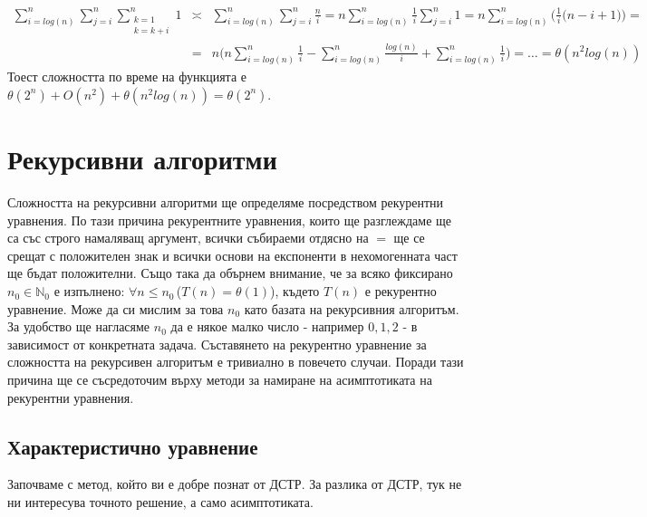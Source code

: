 \begin{solution}
	\begin{eqnarray*}
		\sum\limits_{i=log(n)}^n\sum\limits_{j=i}^n\sum\limits_{\substack{k=1\\k=k+i}}^n1 &\asymp&
		\sum\limits_{i=log(n)}^n\sum\limits_{j=i}^n\frac ni =
		n\sum\limits_{i=log(n)}^n\frac1i\sum\limits_{j=i}^n1 =
		n\sum\limits_{i=log(n)}^n\bigg(\frac1i\Big(n-i+1\Big)\bigg) = \\
		&=&
		n\Bigg(n\sum\limits_{i=log(n)}^n\frac1i-\sum\limits_{i=log(n)}^n\frac{log(n)}i+\sum\limits_{i=log(n)}^n\frac1i\Bigg) = 
		\dots =
		\theta(n^2log(n))		
	\end{eqnarray*}
	Тоест сложността по време на функцията е $\theta(2^n)+O(n^2)+\theta(n^2log(n))=\theta(2^n)$.
\end{solution}\newpage


\section{Рекурсивни алгоритми}\label{sec-rec-alg}

Сложността на рекурсивни алгоритми ще определяме посредством рекурентни уравнения. По тази причина рекурентните уравнения, които ще разглеждаме ще са със строго намаляващ аргумент, всички събираеми отдясно на $=$ ще се срещат с положителен знак и всички основи на експоненти в нехомогенната част ще бъдат положителни. Също така да обърнем внимание, че за всяко фиксирано $n_0\in\mathbb{N}_0$ е изпълнено: $\forall n\le n_0\,$($T(n)=\theta(1)$), където $T(n)$ е рекурентно уравнение. Може да си мислим за това $n_0$ като базата на рекурсивния алгоритъм. За удобство ще нагласяме $n_0$ да е някое малко число - например $0,1,2$ - в зависимост от конкретната задача. Съставянето на рекурентно уравнение за сложността на рекурсивен алгоритъм е тривиално в повечето случаи. Поради тази причина ще се съсредоточим върху методи за намиране на асимптотиката на рекурентни уравнения.\\

\subsection{Характеристично уравнение}

Започваме с метод, който ви е добре познат от ДСТР. За разлика от ДСТР, тук не ни интересува точното решение, а само асимптотиката.

